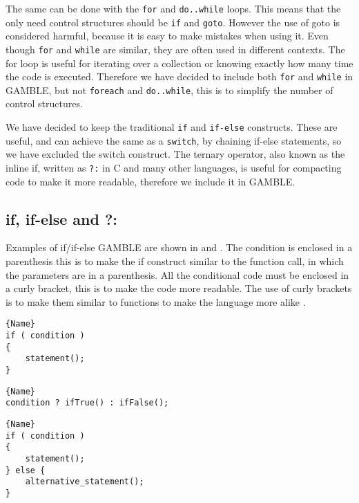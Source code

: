 The same can be done with the \texttt{for} and \texttt{do..while} loops. 
This means that the only need control structures should be \texttt{if} and \texttt{goto}. 
However the use of goto is considered harmful, because it is easy to make mistakes when using it. \citep{DijkstraGoto}
Even though \texttt{for} and \texttt{while} are similar, they are often used in different contexts.
The for loop is useful for iterating over a collection or knowing exactly how many time the code is executed. 
Therefore we have decided to include both \texttt{for} and \texttt{while} in GAMBLE, but not \texttt{foreach} and \texttt{do..while}, this is to simplify the number of control structures.

We have decided to keep the traditional \texttt{if} and \texttt{if-else} constructs. 
These are useful, and can achieve the same as a \texttt{switch}, by chaining if-else statements, so we have excluded the switch construct. 
The ternary operator, also known as the inline if, written as \texttt{?:} in C and many other languages, is useful for compacting code to make it more readable, therefore we include it in GAMBLE.

\subsection{if, if-else and ?:} 
Examples of if/if-else GAMBLE are shown in  and . 
The condition is enclosed in a parenthesis this is to make the if construct similar to the function call, in which the parameters are in a parenthesis. 
All the conditional code must be enclosed in a curly bracket, this is to make the code more readable. 
The use of curly brackets is to make them similar to functions to make the language more alike .

\noindent\begin{minipage}{.45\textwidth}
\begin{lstlisting}[caption=An if statement in GAMBLE.,frame=tlrb, label=iflst, numbers=none]{Name}
if ( condition )
{
    statement();
}
\end{lstlisting}
\begin{lstlisting}[caption=A use of \texttt{?:} in GAMBLE.,frame=tlrb, label=terlst, numbers=none]{Name}
condition ? ifTrue() : ifFalse();
\end{lstlisting}

\end{minipage}\hfill
\begin{minipage}{.45\textwidth}
\begin{lstlisting}[caption=An if-else statement in GAMBLE.,frame=tlrb, label=ifelselst, numbers=none]{Name}
if ( condition )
{
    statement();
} else {
    alternative_statement();
}
\end{lstlisting}
\end{minipage}

